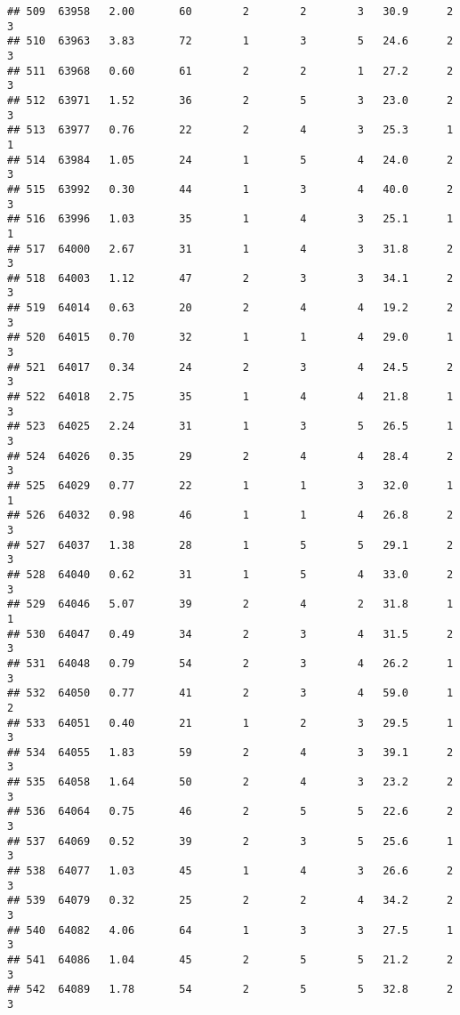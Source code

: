 \documentclass[
]{article}
\begin{document}
\begin{verbatim}
## 509  63958   2.00       60        2        2        3   30.9      2      3
## 510  63963   3.83       72        1        3        5   24.6      2      3
## 511  63968   0.60       61        2        2        1   27.2      2      3
## 512  63971   1.52       36        2        5        3   23.0      2      3
## 513  63977   0.76       22        2        4        3   25.3      1      1
## 514  63984   1.05       24        1        5        4   24.0      2      3
## 515  63992   0.30       44        1        3        4   40.0      2      3
## 516  63996   1.03       35        1        4        3   25.1      1      1
## 517  64000   2.67       31        1        4        3   31.8      2      3
## 518  64003   1.12       47        2        3        3   34.1      2      3
## 519  64014   0.63       20        2        4        4   19.2      2      3
## 520  64015   0.70       32        1        1        4   29.0      1      3
## 521  64017   0.34       24        2        3        4   24.5      2      3
## 522  64018   2.75       35        1        4        4   21.8      1      3
## 523  64025   2.24       31        1        3        5   26.5      1      3
## 524  64026   0.35       29        2        4        4   28.4      2      3
## 525  64029   0.77       22        1        1        3   32.0      1      1
## 526  64032   0.98       46        1        1        4   26.8      2      3
## 527  64037   1.38       28        1        5        5   29.1      2      3
## 528  64040   0.62       31        1        5        4   33.0      2      3
## 529  64046   5.07       39        2        4        2   31.8      1      1
## 530  64047   0.49       34        2        3        4   31.5      2      3
## 531  64048   0.79       54        2        3        4   26.2      1      3
## 532  64050   0.77       41        2        3        4   59.0      1      2
## 533  64051   0.40       21        1        2        3   29.5      1      3
## 534  64055   1.83       59        2        4        3   39.1      2      3
## 535  64058   1.64       50        2        4        3   23.2      2      3
## 536  64064   0.75       46        2        5        5   22.6      2      3
## 537  64069   0.52       39        2        3        5   25.6      1      3
## 538  64077   1.03       45        1        4        3   26.6      2      3
## 539  64079   0.32       25        2        2        4   34.2      2      3
## 540  64082   4.06       64        1        3        3   27.5      1      3
## 541  64086   1.04       45        2        5        5   21.2      2      3
## 542  64089   1.78       54        2        5        5   32.8      2      3

\end{verbatim}
\end{document}
